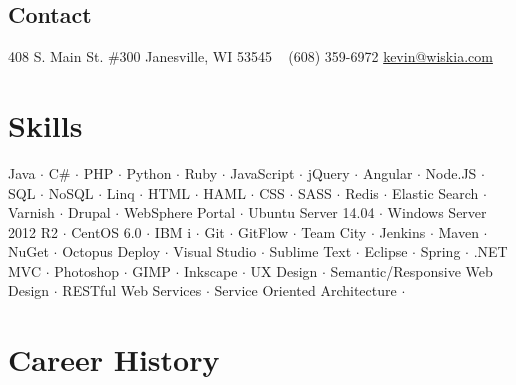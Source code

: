 \documentclass[]{clean-resume}
\begin{document}



\begin{aside}
  \section{Contact}
    408 S. Main St. \#300
	Janesville, WI 53545
    ~
    (608) 359-6972
    \href{mailto:kevin@wiskia.com.com?subject=Resume}{kevin@wiskia.com}
\end{aside}


\section{Skills}

\vspace{.25cm}

\begin{centering}
{ \small
	Java $\cdot$
	C\# $\cdot$
	PHP $\cdot$
	Python $\cdot$
	Ruby $\cdot$
	JavaScript $\cdot$
	jQuery $\cdot$
	Angular $\cdot$
	Node.JS $\cdot$
	SQL $\cdot$
	NoSQL $\cdot$
	Linq $\cdot$
	HTML $\cdot$
	HAML $\cdot$
	CSS $\cdot$
	SASS $\cdot$
	Redis $\cdot$
	Elastic Search $\cdot$
	Varnish $\cdot$
	Drupal $\cdot$
	WebSphere Portal $\cdot$
	Ubuntu Server 14.04 $\cdot$
	Windows Server 2012 R2 $\cdot$
	CentOS 6.0 $\cdot$
	IBM i $\cdot$
	Git $\cdot$
	GitFlow $\cdot$
	Team City $\cdot$
	Jenkins $\cdot$
	Maven $\cdot$
	NuGet $\cdot$
	Octopus Deploy $\cdot$
	Visual Studio $\cdot$
	Sublime Text $\cdot$
	Eclipse $\cdot$
	Spring $\cdot$
	.NET MVC $\cdot$
	Photoshop $\cdot$
	GIMP $\cdot$
	Inkscape $\cdot$
	UX Design $\cdot$
	Semantic/Responsive Web Design $\cdot$
	RESTful Web Services $\cdot$
	Service Oriented Architecture $\cdot$
}
\end{centering}

\vspace{.25cm}

\section{Career History}
\end{document}
